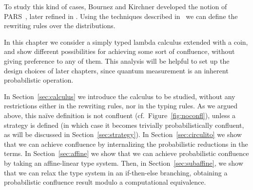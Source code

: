 To study this kind of cases, Bournez and Kirchner developed the notion of PARS~\cite{BK02}, later refined in \cite{BG06}. Using the techniques described in~\cite{DCM17,Faggian} we can define the rewriting rules over the distributions.

In this chapter we consider a simply typed lambda calculus extended with a coin, and show different possibilities for achieving some sort of confluence, without giving preference to any of them. This analysis will be helpful to set up the design choices of later chapters, since quantum measurement is an inherent probabilistic operation.

In Section~\ref{sec:calculus} we introduce the calculus to be studied, without any restrictions either in the rewriting rules, nor in the typing rules. As we argued above, this na\"ive definition is not confluent (cf.~Figure~\ref{fig:noconfl}), unless a strategy is defined (in which case it becomes trivially probabilistically confluent, as will be discussed in Section~\ref{sec:strategy}).
In Section~\ref{sec:circulito} we show that we can achieve confluence by internalizing the probabilistic reductions in the terms. In Section~\ref{sec:affine} we show that we can achieve probabilistic confluence by taking an affine-linear type system. Then, in Section~\ref{sec:subaffine}, we show that we can relax the type system in an if-then-else branching, obtaining a probabilistic confluence result modulo a computational equivalence.

